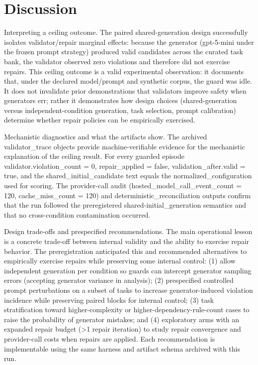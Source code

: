 \documentclass[conference]{IEEEtran}
\begin{document}
\section{Discussion}
Interpreting a ceiling outcome. The paired shared-generation design successfully isolates validator/repair marginal effects: because the generator (gpt-5-mini under the frozen prompt strategy) produced valid candidates across the curated task bank, the validator observed zero violations and therefore did not exercise repairs. This ceiling outcome is a valid experimental observation: it documents that, under the declared model/prompt and synthetic corpus, the guard was idle. It does not invalidate prior demonstrations that validators improve safety when generators err; rather it demonstrates how design choices (shared-generation versus independent-condition generation, task selection, prompt calibration) determine whether repair policies can be empirically exercised.

Mechanistic diagnostics and what the artifacts show. The archived validator\_trace objects provide machine-verifiable evidence for the mechanistic explanation of the ceiling result. For every guarded episode validator.violation\_count = 0, repair\_applied = false, validation\_after.valid = true, and the shared\_initial\_candidate text equals the normalized\_configuration used for scoring. The provider-call audit (hosted\_model\_call\_event\_count = 120, cache\_miss\_count = 120) and deterministic\_reconciliation outputs confirm that the run followed the preregistered shared-initial\_generation semantics and that no cross-condition contamination occurred.

Design trade-offs and prespecified recommendations. The main operational lesson is a concrete trade-off between internal validity and the ability to exercise repair behavior. The preregistration anticipated this and recommended alternatives to empirically exercise repairs while preserving some internal control: (1) allow independent generation per condition so guards can intercept generator sampling errors (accepting generator variance in analysis); (2) prespecified controlled prompt perturbations on a subset of tasks to increase generator-induced violation incidence while preserving paired blocks for internal control; (3) task stratification toward higher-complexity or higher-dependency-rule-count cases to raise the probability of generator mistakes; and (4) exploratory arms with an expanded repair budget (>1 repair iteration) to study repair convergence and provider-call costs when repairs are applied. Each recommendation is implementable using the same harness and artifact schema archived with this run.
\end{document}
